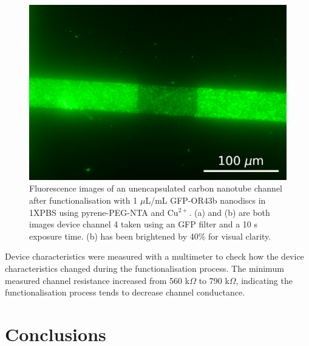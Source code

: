 \documentclass[
  a4paper,
]{scrbook}
\begin{document}
\begin{figure}
\begin{minipage}[t]{0.47\linewidth}
{{\includegraphics{figures/ch6/modified_GFPOR_Cu2+_10sexposure_40X_mediumcontrast_ch4_231027_40b.png}

}

}

\subcaption{\label{fig-PPN-GFP-OR-2}}
\end{minipage}%

\caption{\label{fig-PPN-GFP-ORs}Fluorescence images of an unencapsulated
carbon nanotube channel after functionalisation with 1 \(\mu\)L/mL
GFP-OR43b nanodiscs in 1XPBS using pyrene-PEG-NTA and Cu\(^{2+}\). (a)
and (b) are both images device channel 4 taken using an GFP filter and a
10 s exposure time. (b) has been brightened by 40\% for visual clarity.}

\end{figure}

Device characteristics were measured with a multimeter to check how the
device characteristics changed during the functionalisation process. The
minimum measured channel resistance increased from 560 k\(\Omega\) to
790 k\(\Omega\), indicating the functionalisation process tends to
decrease channel conductance.

\hypertarget{sec-conclusions}{%
\section{Conclusions}\label{sec-conclusions}}
\end{document}
